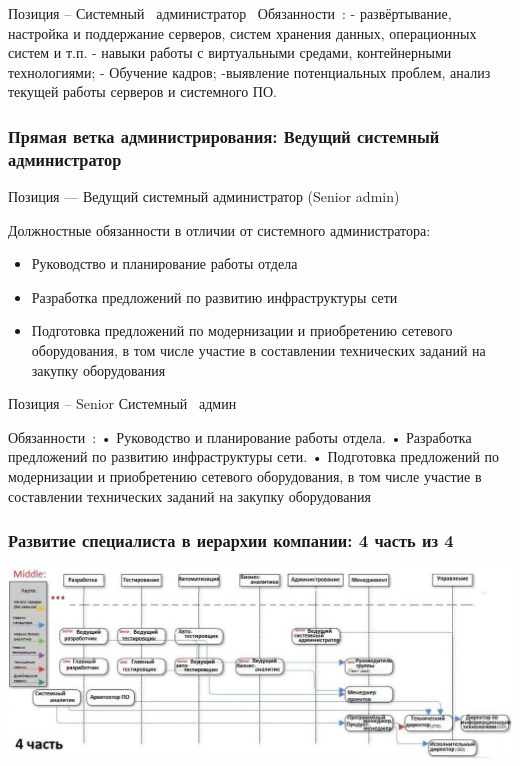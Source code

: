 \documentclass{../industrial-development}
\begin{document}
{\lecturenotes
Позиция – Системный~\cite{hh} администратор~\cite{itcf}
Обязанности~\cite{rab}:
- развёртывание, настройка и поддержание серверов, систем хранения данных, операционных систем и т.п.
- навыки работы с виртуальными средами, контейнерными технологиями;
- Обучение кадров;
-выявление потенциальных проблем, анализ текущей работы серверов и системного ПО.

\begin{frame} \frametitle{Прямая ветка администрирования: Ведущий системный администратор }
 \begin{block}{}
  \alert{Позиция --- Ведущий системный администратор (Senior admin)}

Должностные обязанности в отличии от  системного администратора: 
  \end{block}
  \begin{itemize}
  \item   Руководство и планирование работы отдела
  \item  Разработка предложений по развитию инфраструктуры сети
  \item Подготовка предложений по модернизации и приобретению сетевого оборудования, в том числе участие в составлении технических заданий на закупку оборудования
  \end{itemize}
\end{frame}

\lecturenotes
Позиция – Senior Системный~\cite{hh} админ~\cite{itcf}

Обязанности~\cite{rab}:
•	Руководство и планирование работы отдела.
•	Разработка предложений по развитию инфраструктуры сети.
•	Подготовка предложений по модернизации и приобретению сетевого оборудования, в том числе участие в составлении технических заданий на закупку оборудования



\begin{frame} \frametitle{Развитие  специалиста в иерархии компании: 4 часть из 4 }
  \centerline{\includegraphics[height=0.53\textheight]{11-IT-specialist's-way/sch22.pdf}}
\end{frame}


}
\end{document}
